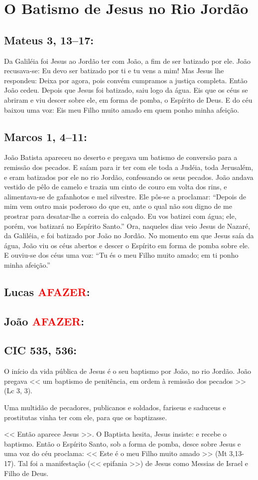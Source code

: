 \documentclass[10pt,a5paper]{book}
\newcommand{\from}[1]{\subsection*{#1}}
\newcommand{\TODO}{\textcolor{red}{\ttfamily AFAZER}}
\begin{document}

\section{O Batismo de Jesus no Rio Jordão}

\from{Mateus 3, 13--17:}

Da Galiléia foi Jesus ao Jordão ter com João, a fim de ser batizado por ele.
João recusava-se: Eu devo ser batizado por ti e tu vens a mim!
Mas Jesus lhe respondeu:
Deixa por agora, pois convém cumpramos a justiça completa.
Então João cedeu.
Depois que Jesus foi batizado, saiu logo da água.
Eis que os céus se abriram e viu descer sobre ele, em forma de pomba, o Espírito de Deus.
E do céu baixou uma voz:
Eis meu Filho muito amado em quem ponho minha afeição.

\from{Marcos 1, 4--11:}

João Batista apareceu no deserto e pregava um batismo de conversão para a remissão dos pecados.
E saíam para ir ter com ele toda a Judéia, toda Jerusalém, e eram batizados por ele no rio Jordão, confessando os seus pecados.
João andava vestido de pêlo de camelo e trazia um cinto de couro em volta dos rins, e alimentava-se de gafanhotos e mel silvestre.
Ele pôs-se a proclamar:
``Depois de mim vem outro mais poderoso do que eu, ante o qual não sou digno de me prostrar para desatar-lhe a correia do calçado.
Eu vos batizei com água; ele, porém, vos batizará no Espírito Santo.''
Ora, naqueles dias veio Jesus de Nazaré, da Galiléia, e foi batizado por João no Jordão.
No momento em que Jesus saía da água, João viu os céus abertos e descer o Espírito em forma de pomba sobre ele.
E ouviu-se dos céus uma voz:
``Tu és o meu Filho muito amado; em ti ponho minha afeição.''

\from{Lucas \TODO:}

\from{João \TODO:}

\from{CIC 535, 536:}

O início da vida pública de Jesus é o seu baptismo por João, no rio Jordão.
João pregava << um baptismo de penitência, em ordem à remissão dos pecados >> (Lc 3, 3).

Uma multidão de pecadores, publicanos e soldados, fariseus e saduceus e prostitutas vinha ter com ele, para que os baptizasse.

<< Então aparece Jesus >>.
O Baptista hesita, Jesus insiste:
e recebe o baptismo.
Então o Espírito Santo, sob a forma de pomba, desce sobre Jesus e uma voz do céu proclama:
<< Este é o meu Filho muito amado >> (Mt 3,13-17).
Tal foi a manifestação (<< epifania >>) de Jesus como Messias de Israel e Filho de Deus.
\end{document}
